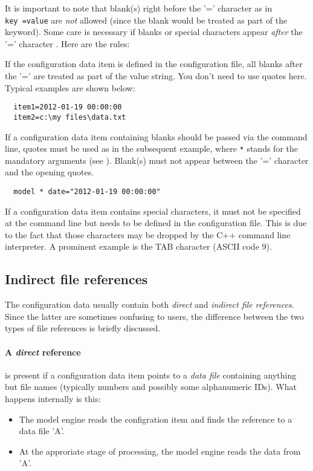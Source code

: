 It is important to note that blank(s) right before the '=' character as in \texttt{key~=value} are \emph{not} allowed (since the blank would be treated as part of the keyword). Some care is necessary if blanks or special characters appear \emph{after} the '=' character . Here are the rules:

If the configuration data item is defined in the configuration file, all blanks after the '=' are treated as part of the value string. You don't need to use quotes here. Typical examples are shown below:
\begin{verbatim}
  item1=2012-01-19 00:00:00
  item2=c:\my files\data.txt
\end{verbatim}

If a configuration data item containing blanks should be passed via the command line, quotes must be used as in the subsequent example, where \verb!*! stands for the mandatory arguments (see ). Blank(s) must not appear between the '=' character and the opening quotes.
\begin{verbatim}
  model * date="2012-01-19 00:00:00"
\end{verbatim}

If a configuration data item contains special characters, it must not be specified at the command line but needs to be defined in the configuration file. This is due to the fact that those characters may be dropped by the C++ command line interpreter. A prominent example is the TAB character (ASCII code 9).

\subsection{Indirect file references} \label{sec:input-config-indirectRef}
The configuration data usually contain both \emph{direct} and \emph{indirect file references}. Since the latter are sometimes confusing to users, the difference between the two types of file references is briefly discussed. 

\paragraph{A \emph{direct} reference} is present if a configuration data item points to a \emph{data file} containing anything but file names (typically numbers and possibly some alphanumeric IDs). What happens internally is this:
\begin{itemize}
  \item The model engine reads the configration item and finds the reference to a data file 'A'.
  \item At the approriate stage of processing, the model engine reads the data from 'A'.
\end{itemize}

